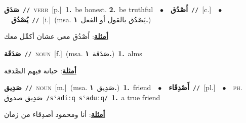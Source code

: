 \documentclass[10pt,a4paper,twoside]{article} %
\begin{document}
\begin{multicols}{2}
{\setlength\topsep{0pt}\textbf{\foreignlanguage{arabic}{صَدَق}}\ {\color{gray}\texttt{//}\color{black}}\ \textsc{verb}\ [p.]\ \textbf{1.}~be honest.  \textbf{2.}~be truthful\ \ $\bullet$\ \ \setlength\topsep{0pt}\textbf{\foreignlanguage{arabic}{اُصْدُق}}\ {\color{gray}\texttt{//}\color{black}}\ [c.]\ \ $\bullet$\ \ \setlength\topsep{0pt}\textbf{\foreignlanguage{arabic}{يُصْدُق}}\ {\color{gray}\texttt{//}\color{black}}\ [i.]\ \color{gray}(msa. \foreignlanguage{arabic}{يَصْدُق بالقول أو الفعل}~\foreignlanguage{arabic}{\textbf{١.}})\color{black}\  \begin{flushright}\color{gray}\foreignlanguage{arabic}{\textbf{\underline{\foreignlanguage{arabic}{أمثلة}}}: اُصْدُق معي عشان أكمِّل معك}\end{flushright}\color{black}} \vspace{2mm}

{\setlength\topsep{0pt}\textbf{\foreignlanguage{arabic}{صَدَقَة}}\ {\color{gray}\texttt{//}\color{black}}\ \textsc{noun}\ [f.]\ \color{gray}(msa. \foreignlanguage{arabic}{صَدَقة}~\foreignlanguage{arabic}{\textbf{١.}})\color{black}\ \textbf{1.}~alms\  \begin{flushright}\color{gray}\foreignlanguage{arabic}{\textbf{\underline{\foreignlanguage{arabic}{أمثلة}}}: حيانة فيهم الصَّدقة}\end{flushright}\color{black}} \vspace{2mm}

{\setlength\topsep{0pt}\textbf{\foreignlanguage{arabic}{صَدِيق}}\ {\color{gray}\texttt{//}\color{black}}\ \textsc{noun}\ [m.]\ \color{gray}(msa. \foreignlanguage{arabic}{صَدِيق}~\foreignlanguage{arabic}{\textbf{١.}})\color{black}\ \textbf{1.}~friend\ \ $\bullet$\ \ \setlength\topsep{0pt}\textbf{\foreignlanguage{arabic}{أَصْدِقَاء}}\ {\color{gray}\texttt{//}\color{black}}\ [pl.]\ \ $\bullet$\ \ \textsc{ph.} \color{gray} \foreignlanguage{arabic}{صَدِيق صدوق}\color{black}\ {\color{gray}\texttt{/{\sffamily sˤadiːq sˤaduːq}/}\color{black}}\ \textbf{1.}~a true friend\  \begin{flushright}\color{gray}\foreignlanguage{arabic}{\textbf{\underline{\foreignlanguage{arabic}{أمثلة}}}: أنا ومحمود أصدِقاء من زمان}\end{flushright}\color{black}} \vspace{2mm}


\end{multicols}
\end{document}
